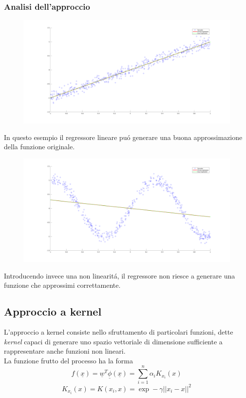 \documentclass[12pt]{article}
\begin{document}
\subsubsection{Analisi dell'approccio}
\begin{figure}[H]
  \centering
  \includegraphics[width=\textwidth]{images/LinearRegressionLine}
\end{figure}
In questo esempio il regressore lineare puó generare una buona approssimazione della funzione originale.
\begin{figure}[H]
  \centering
  \includegraphics[width=\textwidth]{images/LinearRegressionSine}
\end{figure}
Introducendo invece una non linearitá, il regressore non riesce a generare una funzione
che approssimi correttamente.

\newpage
\subsection{Approccio a kernel}

L'approccio a kernel consiste nello sfruttamento di particolari funzioni, dette \textit{kernel}
capaci di generare uno spazio vettoriale di dimensione sufficiente a rappresentare anche funzioni non lineari. \\
La funzione frutto del processo ha la forma
$$
  f(\underline{x}) = \underline{w}^T \underline{\phi}(\underline{x})
                   = \sum_{i=1}^n \alpha_i K_{x_i}(x)
$$
$$
  K_{x_i}(x) = K(x_i, x) = \exp - \gamma || x_i - x ||^2
$$
\end{document}
